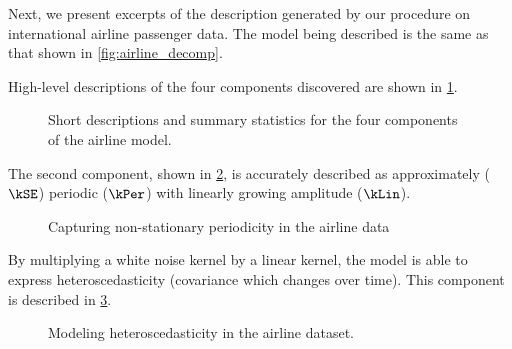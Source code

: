 Next, we present excerpts of the description generated by our procedure on international airline passenger data. %
The model being described is the same as that shown in \cref{fig:airline_decomp}.

High-level descriptions of the four components discovered are shown in \cref{fig:exec-airline}.
%
\begin{figure}[ht!]
\centering
{}
\caption[Short descriptions of the four components of the airline model]
{Short descriptions and summary statistics for the four components of the airline model.}
\label{fig:exec-airline}
\end{figure}
%
The second component, shown in \cref{fig:lin_periodic}, is accurately described as approximately ($\kSE$) periodic ($\kPer$) with linearly growing amplitude ($\kLin$).
%
\begin{figure}[ht!]
\centering
{}
\caption[Capturing non-stationary periodicity in the airline data]
{Capturing non-stationary periodicity in the airline data}
\label{fig:lin_periodic}
\end{figure}
%
By multiplying a white noise kernel by a linear kernel, the model is able to express heteroscedasticity (covariance which changes over time).
This component is described in \cref{fig:heteroscedastic}.
%
\begin{figure}[ht!]
\centering
{}
\caption[Modeling heteroscedasticity in the airline dataset]
{Modeling heteroscedasticity in the airline dataset.}
\label{fig:heteroscedastic}
\end{figure}

